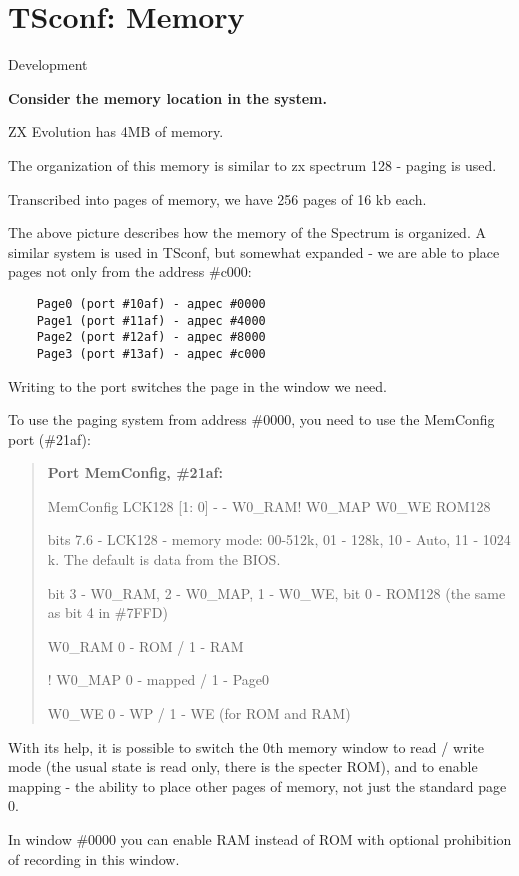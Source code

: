 \documentclass{article}
\begin{document}
\section*{TSconf: Memory}

Development

\textbf{Consider the memory location in the system. }

ZX Evolution has 4MB of memory.

The organization of this memory is similar to zx spectrum 128 - paging
is used.

Transcribed into pages of memory, we have 256 pages of 16 kb each.

The above picture describes how the memory of the Spectrum is
organized. A similar system is used in TSconf, but somewhat expanded -
we are able to place pages not only from the address \#c000:

\begin{verbatim}
    Page0 (port #10af) - адрес #0000
    Page1 (port #11af) - адрес #4000
    Page2 (port #12af) - адрес #8000
    Page3 (port #13af) - адрес #c000
\end{verbatim}

Writing to the port switches the page in the window we need.

To use the paging system from address \#0000, you need to use the
MemConfig port (\#21af):

\begin{quotation}
  \textbf{Port MemConfig, \#21af:}

  MemConfig LCK128 [1: 0] - - W0\_RAM! W0\_MAP W0\_WE ROM128

  bits 7.6 - LCK128 - memory mode: 00-512k, 01 - 128k, 10 - Auto, 11 -
  1024 k. The default is data from the BIOS.

  bit 3 - W0\_RAM, 2 - W0\_MAP, 1 - W0\_WE, bit 0 - ROM128 (the same
  as bit 4 in \#7FFD)

  W0\_RAM 0 - ROM / 1 - RAM

  ! W0\_MAP 0 - mapped / 1 - Page0

  W0\_WE 0 - WP / 1 - WE (for ROM and RAM)
\end{quotation}
With its help, it is possible to switch the 0th memory window to read
/ write mode (the usual state is read only, there is the specter ROM),
and to enable mapping - the ability to place other pages of memory,
not just the standard page 0.

In window \#0000 you can enable RAM instead of ROM with optional
prohibition of recording in this window.
\end{document}

